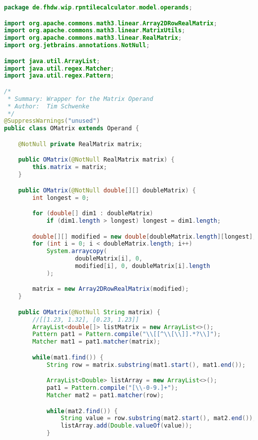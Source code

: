 \begin{lstlisting}[caption=OMatrix (Schwenke),label=list:OMatrix,language=Java]
package de.fhdw.wip.rpntilecalculator.model.operands;

import org.apache.commons.math3.linear.Array2DRowRealMatrix;
import org.apache.commons.math3.linear.MatrixUtils;
import org.apache.commons.math3.linear.RealMatrix;
import org.jetbrains.annotations.NotNull;

import java.util.ArrayList;
import java.util.regex.Matcher;
import java.util.regex.Pattern;

/*
 * Summary: Wrapper for the Matrix Operand
 * Author:  Tim Schwenke
 */
@SuppressWarnings("unused")
public class OMatrix extends Operand {

    @NotNull private RealMatrix matrix;

    public OMatrix(@NotNull RealMatrix matrix) {
        this.matrix = matrix;
    }

    public OMatrix(@NotNull double[][] doubleMatrix) {
        int longest = 0;

        for (double[] dim1 : doubleMatrix)
            if (dim1.length > longest) longest = dim1.length;

        double[][] modified = new double[doubleMatrix.length][longest];
        for (int i = 0; i < doubleMatrix.length; i++)
            System.arraycopy(
                    doubleMatrix[i], 0,
                    modified[i], 0, doubleMatrix[i].length
            );

        matrix = new Array2DRowRealMatrix(modified);
    }

    public OMatrix(@NotNull String matrix) {
        //[[1.23, 1.32], [0.23, 1.23]]
        ArrayList<double[]> listMatrix = new ArrayList<>();
        Pattern pat1 = Pattern.compile("\\[[^\\[\\]].*?\\]");
        Matcher mat1 = pat1.matcher(matrix);

        while(mat1.find()) {
            String row = matrix.substring(mat1.start(), mat1.end());

            ArrayList<Double> listArray = new ArrayList<>();
            pat1 = Pattern.compile("[\\-0-9.]+");
            Matcher mat2 = pat1.matcher(row);

            while(mat2.find()) {
                String value = row.substring(mat2.start(), mat2.end());
                listArray.add(Double.valueOf(value));
            }


\end{lstlisting}
